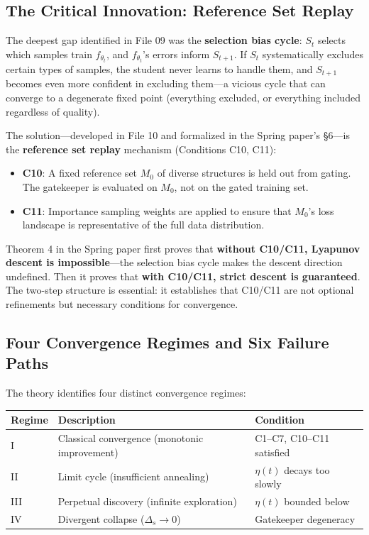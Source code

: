 \documentclass[12pt,a4paper]{ctexart}
\begin{document}
\subsection{The Critical Innovation: Reference Set Replay}

The deepest gap identified in File 09 was the \textbf{selection bias cycle}: $S_t$ selects which samples train $f_{\theta_t}$, and $f_{\theta_t}$'s errors inform $S_{t+1}$. If $S_t$ systematically excludes certain types of samples, the student never learns to handle them, and $S_{t+1}$ becomes even more confident in excluding them—a vicious cycle that can converge to a degenerate fixed point (everything excluded, or everything included regardless of quality).

The solution—developed in File 10 and formalized in the Spring paper's \S6—is the \textbf{reference set replay} mechanism (Conditions C10, C11):
\begin{itemize}
\item \textbf{C10}: A fixed reference set $M_0$ of diverse structures is held out from gating. The gatekeeper is evaluated on $M_0$, not on the gated training set.
\item \textbf{C11}: Importance sampling weights are applied to ensure that $M_0$'s loss landscape is representative of the full data distribution.
\end{itemize}

Theorem 4 in the Spring paper first proves that \textbf{without C10/C11, Lyapunov descent is impossible}—the selection bias cycle makes the descent direction undefined. Then it proves that \textbf{with C10/C11, strict descent is guaranteed}. The two-step structure is essential: it establishes that C10/C11 are not optional refinements but necessary conditions for convergence.

\subsection{Four Convergence Regimes and Six Failure Paths}

The theory identifies four distinct convergence regimes:

\begin{table}[htbp]
\centering
\begin{tabular}{@{}lll@{}}
\toprule
Regime & Description & Condition \\
\midrule
I & Classical convergence (monotonic improvement) & C1–C7, C10–C11 satisfied \\
II & Limit cycle (insufficient annealing) & $\eta(t)$ decays too slowly \\
III & Perpetual discovery (infinite exploration) & $\eta(t)$ bounded below \\
IV & Divergent collapse ($\Delta_s \to 0$) & Gatekeeper degeneracy \\
\bottomrule
\end{tabular}
\end{table}
\end{document}
